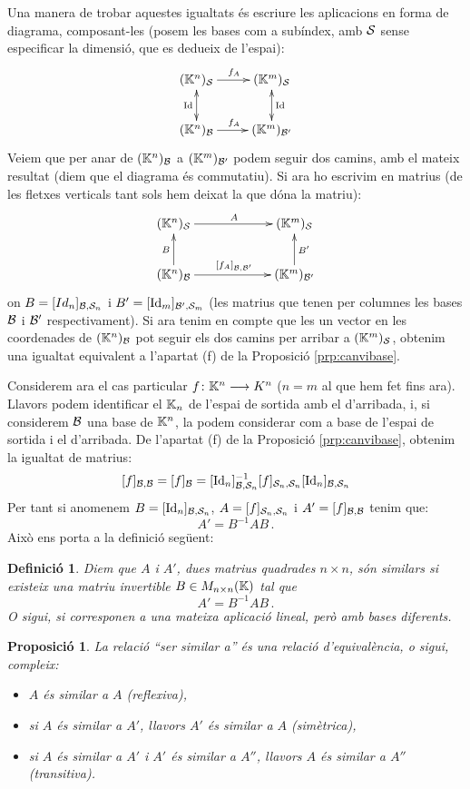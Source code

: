 \documentclass[
  11pt,
]{book}
\numberwithin{dummy}{section}
\theoremstyle{maincolornumbox}
\theoremstyle{blacknumex}
\theoremstyle{blacknumbox}
\newtheorem{definitionT}{Definició}[chapter]
\theoremstyle{maincolornum}
\newtheorem{propositionT}{Proposició}[chapter]
\newenvironment{proposition}{\begin{pBox}\begin{propositionT}}{\end{propositionT}\end{pBox}}
\newenvironment{definition}{\begin{dBox}\begin{definitionT}}{\end{definitionT}\end{dBox}}
\newlength\esp
\begin{document}
Una manera de trobar aquestes igualtats és escriure les aplicacions en
forma de diagrama, composant-les (posem les bases com a subíndex, amb
\(\mathcal{S}\) sense especificar la dimensió, que es dedueix de l'espai):
\[\xymatrix{
(\K^n)_\cals \ar[r]^{f_A} \ar@{<->}[d]_\Id & (\K^m)_\cals \ar@{<->}[d]^\Id \\
(\K^n)_\calb \ar[r]^{f_A} & (\K^m)_{\calb'}}\] Veiem que per anar de
\((\mathbb{K}^n)_{\mathcal{B}}\) a \((\mathbb{K}^m)_{\mathcal{B}'}\) podem seguir dos camins, amb el
mateix resultat (diem que el diagrama és commutatiu). Si ara ho escrivim
en matrius (de les fletxes verticals tant sols hem deixat la que dóna la
matriu): \[\xymatrixcolsep{6em}
\xymatrix{
(\K^n)_\cals \ar[r]^{A}  &  (\K^m)_\cals  \\
(\K^n)_\calb \ar[r]^{[f_A]_{\calb,\calb'}} \ar[u]^B & (\K^m)_{\calb'} \ar[u]_{B'}}\]
on \(B=[Id_n]_{\mathcal{B},\mathcal{S}_n}\) i \(B'=[\operatorname{Id}_m]_{\mathcal{B}',\mathcal{S}_m}\) (les
matrius que tenen per columnes les bases \(\mathcal{B}\) i \(\mathcal{B}'\)
respectivament). Si ara tenim en compte que les un vector en les
coordenades de \((\mathbb{K}^n)_{\mathcal{B}}\) pot seguir els dos camins per arribar a
\((\mathbb{K}^m)_{\mathcal{S}}\), obtenim una igualtat equivalent a l'apartat (f) de la
Proposició \ref{prp:canvibase}.

Considerem ara el cas particular \(f\colon \mathbb{K}^n \longrightarrow K^n\) (\(n=m\) al que
hem fet fins ara). Llavors podem identificar el \(\mathbb{K}_n\) de l'espai de
sortida amb el d'arribada, i, si considerem \(\mathcal{B}\) una base de \(\mathbb{K}^n\),
la podem considerar com a base de l'espai de sortida i el d'arribada. De
l'apartat (f) de la Proposició
\ref{prp:canvibase}, obtenim la igualtat de matrius:
\[[f]_{\mathcal{B},\mathcal{B}}=[f]_{\mathcal{B}}=[\operatorname{Id}_n]_{\mathcal{B},\mathcal{S}_n}^{-1} [f]_{\mathcal{S}_n,\mathcal{S}_n} [\operatorname{Id}_n]_{\mathcal{B},\mathcal{S}_n}\]
Per tant si anomenem \(B=[\operatorname{Id}_n]_{\mathcal{B},\mathcal{S}_n}\),
\(A=[f]_{\mathcal{S}_n,\mathcal{S}_n}\) i \(A'=[f]_{\mathcal{B},\mathcal{B}}\) tenim que:
\[A'=B^{-1} A B \,.\] Això ens porta a la definició següent:

\begin{definition}
Diem que \(A\) i \(A'\), dues matrius quadrades \(n\times n\), són \emph{similars}
si existeix una matriu invertible \(B\in M_{n\times n}(\mathbb{K})\) tal que
\[A'=B^{-1}AB \,.\] O sigui, si corresponen a una mateixa aplicació
lineal, però amb bases diferents.
\end{definition}

\begin{proposition}

La relació ``ser similar a'' és una relació d'equivalència, o sigui,
compleix:

\begin{itemize}
\item
  \(A\) és similar a \(A\) (reflexiva),
\item
  si \(A\) és similar a \(A'\), llavors \(A'\) és similar a \(A\) (simètrica),
\item
  si \(A\) és similar a \(A'\) i \(A'\) és similar a \(A''\), llavors \(A\) és
  similar a \(A''\) (transitiva).
\end{itemize}

\end{proposition}
\end{document}
